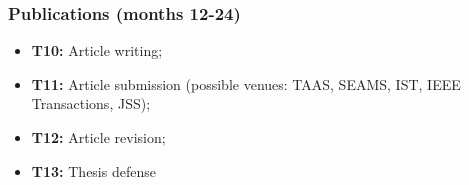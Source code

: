 \subsubsection{Publications (months 12-24)}
\begin{itemize}
	\item \textbf{T10:} Article writing;
	\item \textbf{T11:} Article submission (possible venues: TAAS, SEAMS, IST, IEEE Transactions, JSS);
	\item \textbf{T12:} Article revision;
	\item \textbf{T13:} Thesis defense
	
\end{itemize}

